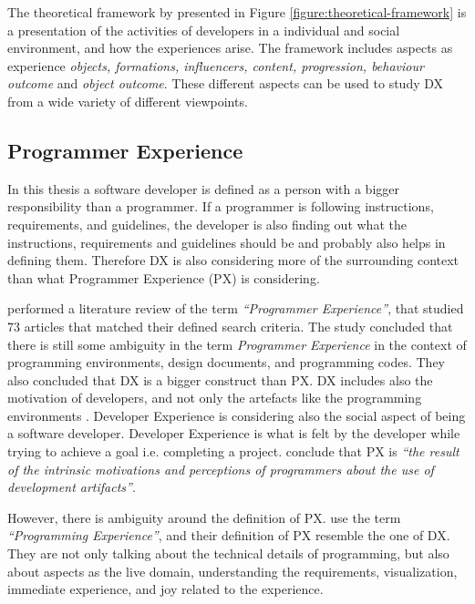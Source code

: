 \documentclass[english, 12pt, a4paper, sci, utf8, a-1b, online]{aaltothesis}
\begin{document}
The theoretical framework by \textcite{fagerholm-doctoral-thesis} presented in Figure \ref{figure:theoretical-framework} is a presentation of the activities of developers in a individual and social environment, and how the experiences arise. The framework includes aspects as experience \textit{objects, formations, influencers, content, progression, behaviour outcome} and \textit{object outcome}. These different aspects can be used to study DX from a wide variety of different viewpoints.

\subsection{Programmer Experience}

In this thesis a software developer is defined as a person with a bigger responsibility than a programmer. If a programmer is following instructions, requirements, and guidelines, the developer is also finding out what the instructions, requirements and guidelines should be and probably also helps in defining them. Therefore DX is also considering more of the surrounding context than what Programmer Experience (PX) is considering.

\textcite{programmer-experience} performed a literature review of the term \textit{``Programmer Experience''}, that studied 73 articles that matched their defined search criteria. The study concluded that there is still some ambiguity in the term \textit{Programmer Experience} in the context of programming environments, design documents, and programming codes. They also concluded that DX is a bigger construct than PX. DX includes also the motivation of developers, and not only the artefacts like the programming environments \parencite{programmer-experience}. Developer Experience is considering also the social aspect of being a software developer. Developer Experience is what is felt by the developer while trying to achieve a goal i.e. completing a project. \textcite{programmer-experience} conclude that PX is \textit{``the result of the intrinsic motivations and perceptions of programmers about the use of development artifacts''}.

However, there is ambiguity around the definition of PX. \textcite{programming-experience} use the term \textit{``Programming Experience''}, and their definition of PX resemble the one of DX. They are not only talking about the technical details of programming, but also about aspects as the live domain, understanding the requirements, visualization, immediate experience, and joy related to the experience.
\end{document}
